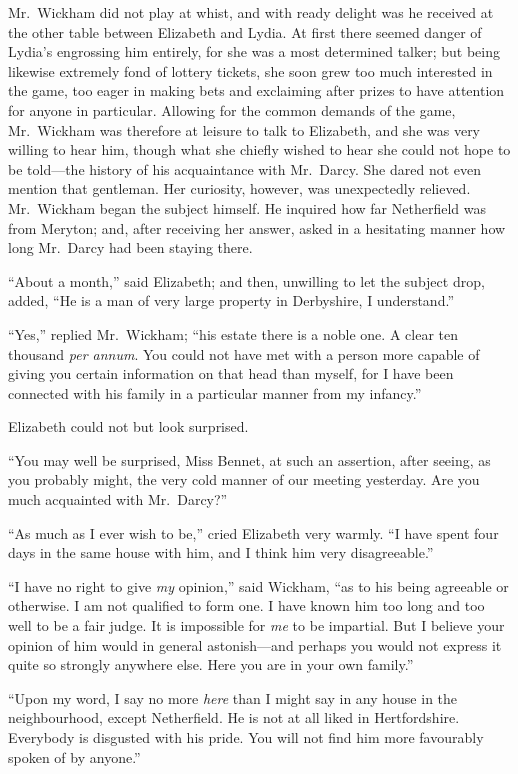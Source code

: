 \documentclass[12pt,english]{book}
\begin{document}
Mr.\ Wickham did not play at whist, and with ready delight was he
received at the other table between Elizabeth and Lydia. At first
there seemed danger of Lydia's engrossing him entirely, for she was
a most determined talker; but being likewise extremely fond of lottery
tickets, she soon grew too much interested in the game, too eager
in making bets and exclaiming after prizes to have attention for anyone
in particular. Allowing for the common demands of the game, Mr.\ Wickham
was therefore at leisure to talk to Elizabeth, and she was very willing
to hear him, though what she chiefly wished to hear she could not
hope to be told\mbox{---}the history of his acquaintance with Mr.\ Darcy.
She dared not even mention that gentleman. Her curiosity, however,
was unexpectedly relieved. Mr.\ Wickham began the subject himself.
He inquired how far Netherfield was from Meryton; and, after receiving
her answer, asked in a hesitating manner how long Mr.\ Darcy had
been staying there.

{}``About a month,'' said Elizabeth; and then, unwilling to let
the subject drop, added, {}``He is a man of very large property in
Derbyshire, I understand.''

{}``Yes,'' replied Mr.\ Wickham; {}``his estate there is a noble
one. A clear ten thousand \emph{per annum}. You could not have met
with a person more capable of giving you certain information on that
head than myself, for I have been connected with his family in a particular
manner from my infancy.''

Elizabeth could not but look surprised.

{}``You may well be surprised, Miss Bennet, at such an assertion,
after seeing, as you probably might, the very cold manner of our meeting
yesterday. Are you much acquainted with Mr.\ Darcy?''\ 

{}``As much as I ever wish to be,'' cried Elizabeth very warmly.
{}``I have spent four days in the same house with him, and I think
him very disagreeable.''

{}``I have no right to give \textit{my} opinion,'' said Wickham,
{}``as to his being agreeable or otherwise. I am not qualified to
form one. I have known him too long and too well to be a fair judge.
It is impossible for \textit{me} to be impartial. But I believe your
opinion of him would in general astonish\mbox{---}and perhaps you
would not express it quite so strongly anywhere else. Here you are
in your own family.''

{}``Upon my word, I say no more \textit{here} than I might say in
any house in the neighbourhood, except Netherfield. He is not at all
liked in Hertfordshire. Everybody is disgusted with his pride. You
will not find him more favourably spoken of by anyone.''
\end{document}
